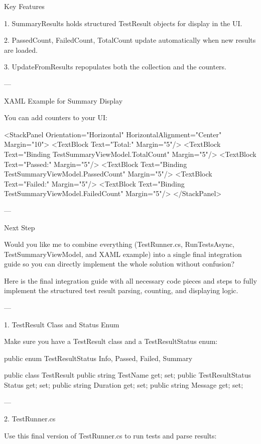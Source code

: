 Key Features

1. SummaryResults holds structured TestResult objects for display in the UI.


2. PassedCount, FailedCount, TotalCount update automatically when new results are loaded.


3. UpdateFromResults repopulates both the collection and the counters.




---

XAML Example for Summary Display

You can add counters to your UI:

<StackPanel Orientation="Horizontal" HorizontalAlignment="Center" Margin="10">
    <TextBlock Text="Total:" Margin="5"/>
    <TextBlock Text="{Binding TestSummaryViewModel.TotalCount}" Margin="5"/>
    <TextBlock Text="Passed:" Margin="5"/>
    <TextBlock Text="{Binding TestSummaryViewModel.PassedCount}" Margin="5"/>
    <TextBlock Text="Failed:" Margin="5"/>
    <TextBlock Text="{Binding TestSummaryViewModel.FailedCount}" Margin="5"/>
</StackPanel>


---

Next Step

Would you like me to combine everything (TestRunner.cs, RunTestsAsync, TestSummaryViewModel, and XAML example) into a single final integration guide so you can directly implement the whole solution without confusion?





Here is the final integration guide with all necessary code pieces and steps to fully implement the structured test result parsing, counting, and displaying logic.


---

1. TestResult Class and Status Enum

Make sure you have a TestResult class and a TestResultStatus enum:

public enum TestResultStatus
{
    Info,
    Passed,
    Failed,
    Summary
}

public class TestResult
{
    public string TestName { get; set; }
    public TestResultStatus Status { get; set; }
    public string Duration { get; set; }
    public string Message { get; set; }
}


---

2. TestRunner.cs

Use this final version of TestRunner.cs to run tests and parse results:

